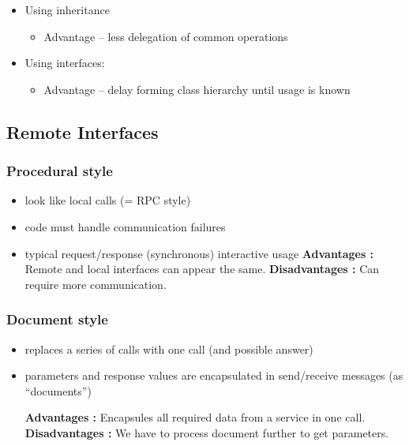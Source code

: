 \begin{itemize}
\tightlist
\item
  Using inheritance

  \begin{itemize}
  \tightlist
  \item
    Advantage -- less delegation of common operations
  \end{itemize}
\item
  Using interfaces:

  \begin{itemize}
  \tightlist
  \item
    Advantage -- delay forming class hierarchy until usage is known
  \end{itemize}
\end{itemize}

\hypertarget{remote-interfaces}{%
\subsection{Remote Interfaces}\label{remote-interfaces}}

\hypertarget{procedural-style}{%
\subsubsection{Procedural style}\label{procedural-style}}

\begin{itemize}
\tightlist
\item
  look like local calls (= RPC style)
\item
  code must handle communication failures
\item
  typical request/response (synchronous) interactive usage
    \subitem 
  \textbf{Advantages :} Remote and local interfaces can appear the same.
  \subitem 
  \textbf{Disadvantages :} Can require more communication.
\end{itemize}

\hypertarget{document-style}{%
\subsubsection{Document style}\label{document-style}}

\begin{itemize}
\tightlist
\item
  replaces a series of calls with one call (and possible answer)
\item
  parameters and response values are encapsulated in send/receive
  messages (as ``documents'')
  
  \subitem 
  \textbf{Advantages :} Encapsules all required data from a service in one call.
  \subitem 
  \textbf{Disadvantages :} We have to process document further to get parameters.
\end{itemize}

